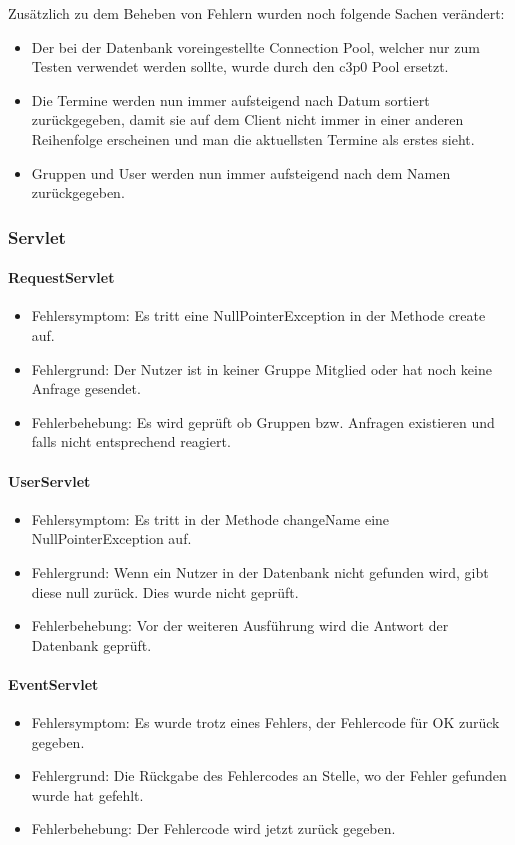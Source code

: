 \documentclass{scrartcl}
\begin{document}
Zusätzlich zu dem Beheben von Fehlern wurden noch folgende Sachen verändert:
\begin{itemize} 
\item Der bei der Datenbank voreingestellte Connection Pool, welcher nur zum Testen verwendet werden sollte, wurde durch den c3p0 Pool ersetzt.
\item Die Termine werden nun immer aufsteigend nach Datum sortiert zurückgegeben, damit sie auf dem Client nicht immer in einer anderen Reihenfolge erscheinen und man die aktuellsten Termine als erstes sieht.
\item Gruppen und User werden nun immer aufsteigend nach dem Namen zurückgegeben.
\end{itemize}
\subsubsection{Servlet}

\paragraph{RequestServlet}
\begin{itemize} 
\item Fehlersymptom: Es tritt eine NullPointerException in der Methode create auf.
\item Fehlergrund: Der Nutzer ist in keiner Gruppe Mitglied oder hat noch keine Anfrage gesendet.
\item Fehlerbehebung: Es wird geprüft ob Gruppen bzw. Anfragen existieren und falls nicht entsprechend reagiert.
\end{itemize}
\paragraph{UserServlet}
\begin{itemize} 
\item Fehlersymptom: Es tritt in der Methode changeName eine NullPointerException auf.
\item Fehlergrund: Wenn ein Nutzer in der Datenbank nicht gefunden wird, gibt diese null zurück. Dies wurde nicht geprüft.
\item Fehlerbehebung: Vor der weiteren Ausführung wird die Antwort der Datenbank geprüft.
\end{itemize}
\paragraph{EventServlet}
\begin{itemize} 
\item Fehlersymptom: Es wurde trotz eines Fehlers, der Fehlercode für OK zurück gegeben.
\item Fehlergrund: Die Rückgabe des Fehlercodes an Stelle, wo der Fehler gefunden wurde hat gefehlt.
\item Fehlerbehebung: Der Fehlercode wird jetzt zurück gegeben.
\end{itemize}
\newpage
\end{document}
